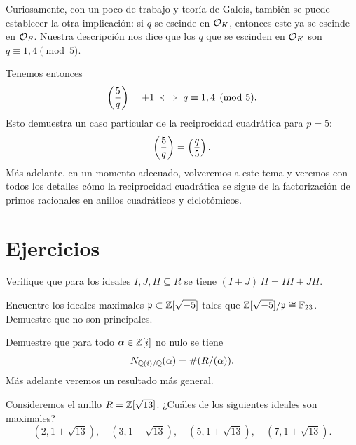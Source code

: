\begin{ejemplo}
  Curiosamente, con un poco de trabajo y teoría de Galois, también se puede
  establecer la otra implicación: si $q$ se escinde en $\mathcal{O}_K$, entonces este ya
  se escinde en $\mathcal{O}_F$. Nuestra descripción nos dice que los $q$ que se escinden
  en $\mathcal{O}_K$ son $q \equiv 1,4 \pmod{5}$.

  Tenemos entonces
  $$\left(\frac{5}{q}\right) = +1 \iff q \equiv 1,4 \pmod{5}.$$
  Esto demuestra un caso particular de la reciprocidad cuadrática para $p = 5$:
  $$\left(\frac{5}{q}\right) = \left(\frac{q}{5}\right).$$
  Más adelante, en un momento adecuado, volveremos a este tema y veremos con
  todos los detalles cómo la reciprocidad cuadrática se sigue de la
  factorización de primos racionales en anillos cuadráticos y ciclotómicos.
\end{ejemplo}


\pagebreak


\section*{Ejercicios}

\begin{ejercicio}
  Verifique que para los ideales $I, J, H \subseteq R$ se tiene
  $(I+J)\,H = IH + JH$.
\end{ejercicio}

\begin{ejercicio}
  Encuentre los ideales maximales $\mathfrak{p} \subset \mathbb{Z} [\sqrt{-5}]$ tales
  que $\mathbb{Z} [\sqrt{-5}]/\mathfrak{p} \cong \mathbb{F}_{23}$. Demuestre que no son
  principales.
\end{ejercicio}

\begin{ejercicio}
  Demuestre que para todo $\alpha \in \mathbb{Z} [i]$ no nulo se tiene
  $$N_{\mathbb{Q} (i)/\mathbb{Q}} (\alpha) = \# (R/(\alpha)).$$
  Más adelante veremos un resultado más general.
\end{ejercicio}

\begin{ejercicio}
  Consideremos el anillo $R = \mathbb{Z} [\sqrt{13}]$. ¿Cuáles de los siguientes
  ideales son maximales?
  \[ (2, 1 + \sqrt{13}), \quad
     (3, 1 + \sqrt{13}), \quad
     (5, 1 + \sqrt{13}), \quad
     (7, 1 + \sqrt{13}). \]
\end{ejercicio}


